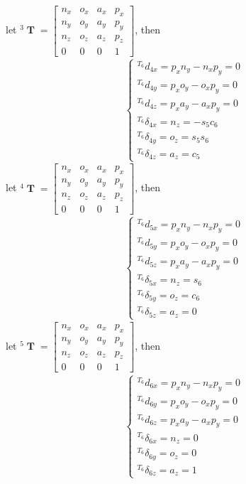 \documentclass[12pt]{article}
\DeclareMathOperator{\T}{\mathbf{T}}
\begin{document}
  let
  $^3\T = \begin{bmatrix}
    n_x & o_x & a_x & p_x\\
    n_y & o_y & a_y & p_y\\
    n_z & o_z & a_z & p_z\\
    0 & 0 & 0 & 1
  \end{bmatrix}$, then
  \begin{align*}
    \begin{cases}
      ^{T_6}d_{4x} = p_xn_y-n_xp_y = 0\\
      ^{T_6}d_{4y} = p_xo_y-o_xp_y = 0\\
      ^{T_6}d_{4z} = p_xa_y-a_xp_y = 0\\
      ^{T_6}\delta_{4x} = n_z = -s_5c_6\\
      ^{T_6}\delta_{4y} = o_z = s_5s_6\\
      ^{T_6}\delta_{4z} = a_z = c_5
    \end{cases}
  \end{align*}
  let
  $^4\T = \begin{bmatrix}
    n_x & o_x & a_x & p_x\\
    n_y & o_y & a_y & p_y\\
    n_z & o_z & a_z & p_z\\
    0 & 0 & 0 & 1
  \end{bmatrix}$, then
  \begin{align*}
    \begin{cases}
      ^{T_6}d_{5x} = p_xn_y-n_xp_y = 0\\
      ^{T_6}d_{5y} = p_xo_y-o_xp_y = 0\\
      ^{T_6}d_{5z} = p_xa_y-a_xp_y = 0\\
      ^{T_6}\delta_{5x} = n_z = s_6\\
      ^{T_6}\delta_{5y} = o_z = c_6\\
      ^{T_6}\delta_{5z} = a_z = 0
    \end{cases}
  \end{align*}
  let
  $^5\T = \begin{bmatrix}
    n_x & o_x & a_x & p_x\\
    n_y & o_y & a_y & p_y\\
    n_z & o_z & a_z & p_z\\
    0 & 0 & 0 & 1
  \end{bmatrix}$, then
  \begin{align*}
    \begin{cases}
      ^{T_6}d_{6x} = p_xn_y-n_xp_y = 0\\
      ^{T_6}d_{6y} = p_xo_y-o_xp_y = 0\\
      ^{T_6}d_{6z} = p_xa_y-a_xp_y = 0\\
      ^{T_6}\delta_{6x} = n_z = 0\\
      ^{T_6}\delta_{6y} = o_z = 0\\
      ^{T_6}\delta_{6z} = a_z = 1
    \end{cases}
  \end{align*}
\end{document}
